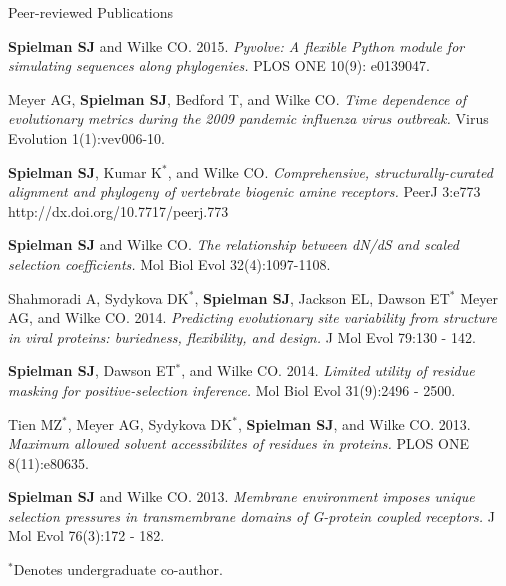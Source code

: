 \documentclass{resume} %
\begin{document}
\vspace*{0.5cm}
\begin{rSection}{Peer-reviewed Publications}
\vspace*{0.25cm}

\begin{etaremune}[leftmargin=1.5em]


\item \textbf{Spielman SJ} and Wilke CO. 2015. \emph{Pyvolve: A flexible Python module for simulating sequences along phylogenies.} PLOS ONE 10(9): e0139047.\\


\item Meyer AG, \textbf{Spielman SJ}, Bedford T, and Wilke CO.  \emph{Time dependence of evolutionary metrics during the 2009 pandemic influenza virus outbreak.} Virus Evolution 1(1):vev006-10. \\
	

\item \textbf{Spielman SJ}, Kumar K$^\ast$, and Wilke CO.  \emph{Comprehensive, structurally-curated alignment and phylogeny of vertebrate biogenic amine receptors.} PeerJ 3:e773 http://dx.doi.org/10.7717/peerj.773 \\ 


\item \textbf{Spielman SJ} and Wilke CO. \emph{The relationship between dN/dS and scaled selection coefficients.} Mol Biol Evol 32(4):1097-1108.\\


\item Shahmoradi A, Sydykova DK$^\ast$, \textbf{Spielman SJ}, Jackson EL, Dawson ET$^\ast$ Meyer AG, and Wilke CO. 2014. \emph{Predicting evolutionary site variability from structure in viral proteins: buriedness, flexibility, and design.} J Mol Evol 79:130 - 142. \\


\item \textbf{Spielman SJ}, Dawson ET$^\ast$, and Wilke CO. 2014. \emph{Limited utility of residue masking for positive-selection inference.} Mol Biol Evol 31(9):2496 - 2500. \\


\item Tien MZ$^\ast$, Meyer AG, Sydykova DK$^\ast$, \textbf{Spielman SJ}, and Wilke CO. 2013. \emph{Maximum allowed solvent accessibilites of residues in proteins.} PLOS ONE 8(11):e80635. \\


\item \textbf{Spielman SJ} and Wilke CO. 2013. \emph{Membrane environment imposes unique selection pressures in transmembrane domains of G-protein coupled receptors.} J Mol Evol 76(3):172 - 182. \\

\end{etaremune}

$^\ast$Denotes undergraduate co-author.


\end{rSection}
\end{document}
